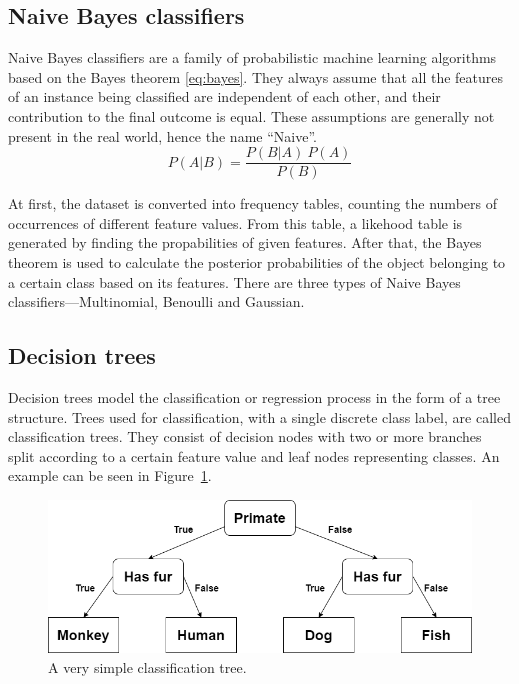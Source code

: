 \subsection*{Naive Bayes classifiers}
\label{naive-bayes-classifiers}
Naive Bayes classifiers are a family of probabilistic machine learning algorithms based on the Bayes theorem 
\eqref{eq:bayes}.
They always assume that all the features of an instance being classified are independent of each other,
and their contribution to the final outcome is equal. These assumptions are generally not present in the real world,
hence the name ``Naive''.
\begin{equation}
\label{eq:bayes}
P(A|B) = \frac{P(B|A) \ P(A)}{P(B)}
\end{equation}

At first, the dataset is converted into frequency tables, counting the numbers of occurrences
of different feature values. From this table, a likehood table is generated by finding the propabilities
of given features. After that, the Bayes theorem is used to calculate the posterior probabilities
of the object belonging to a certain class based on its features.
There are three types of Naive Bayes classifiers---Multinomial, Benoulli and Gaussian.


\subsection*{Decision trees}
\label{decision-trees}
Decision trees model the classification or regression process in the form of a tree structure.
Trees used for classification,
with a single discrete class label, are called classification trees.
They consist of decision nodes with two or more branches split according to a certain feature value
and leaf nodes representing classes.
An example can be seen in Figure~\ref{fig:decision-tree}.

\begin{figure}[!h]
    \centering
    \includegraphics[scale=0.5]{obrazky-figures/decision_tree.png}
    \caption{A very simple classification tree.}
    \label{fig:decision-tree}
\end{figure}

